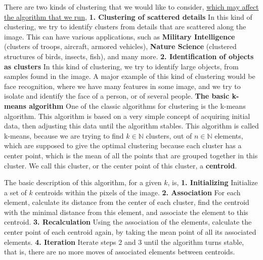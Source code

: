 \documentclass[12pt]{article}
\begin{document}
There are two kinds of clustering that we would like to consider, \newline
\underline{which may affect the algorithm that we run}, \newline \newline
\textbf{1. Clustering of scattered details} \newline
In this kind of clustering, we try to identify clusters from details that are scattered along the image.
This can have various applications, such as \newline \textbf{Military Intelligence} (clusters of troops, aircraft, armored vehicles), \newline
\textbf{Nature Science} (clustered structures of birds, insects, fish), and many more. \newline \newline
\textbf{2. Identification of objects as clusters} \newline
In this kind of clustering, we try to identify large objects, from samples found in the image. A major example of this kind of clustering would be face recognition, 
where we have many features in some image, and we try to isolate and
identify the face of a person, or of several people. \newline
\newpage
\textbf{The basic k-means algorithm} \newline
One of the classic algorithms for clustering is the k-means algorithm. \newline
This algorithm is based on a very simple concept of acquiring initial data, 
then adjusting this data until the algorithm stables. This algorithm is called k-means, 
because we are trying to find \( k \in \mathbb{N} \) clusters, out of \( n \in \mathbb{N} \) elements,
which are supposed to give the optimal clustering because each cluster has a center point, which is the mean of all the points that are grouped
together in this cluster. We call this cluster, or the center point of this cluster, a \textbf{centroid}. \newline

The basic description of this algorithm, for a given \( k \), is, \newline
\textbf{1. Initializing} Initialize a set of \( k \) centroids within the pixels of the image. \newline
\textbf{2. Association} For each element, calculate its distance from the center of each cluster, find the centroid with the minimal distance from this element, and associate the element to this centroid. \newline
\textbf{3. Recalculation} Using the association of the elements, calculate the center point of each centroid again, by taking the mean point of all its associated elements. \newline
\textbf{4. Iteration} Iterate steps 2 and 3 until the algorithm turns stable, that is, there are no more moves of associated elements between centroids. \newline
\end{document}
